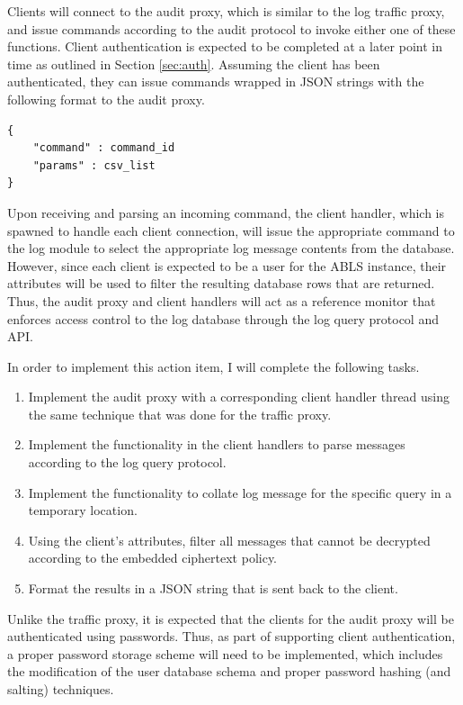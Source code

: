 \documentclass{sig-alternate}
\begin{document}
Clients will connect to the audit proxy, which is similar to the log traffic proxy, and issue commands according to
the audit protocol to invoke either one of these functions. Client authentication is expected to be completed at a later
point in time as outlined in Section \ref{sec:auth}. Assuming the client has been authenticated, they can issue commands
wrapped in JSON strings with the following format to the audit proxy. \\

\begin{lstlisting}
{     
    "command" : command_id
    "params" : csv_list
}
\end{lstlisting}

Upon receiving and parsing an incoming command, the client handler, which is spawned to handle each client connection,
will issue the appropriate command to the log module to select the appropriate log message contents from the database. 
However, since each client is expected to be a user for the ABLS instance, their attributes will be used to filter 
the resulting database rows that are returned. Thus, the audit proxy and client handlers will act
as a reference monitor that enforces access control to the log database through the log query protocol and API.

In order to implement this action item, I will complete the following tasks.

\begin{enumerate}
	\item Implement the audit proxy with a corresponding client handler thread using the same technique that was done for the traffic proxy. 
	\item Implement the functionality in the client handlers to parse messages according to the log query protocol.
	\item Implement the functionality to collate log message for the specific query in a temporary location.
	\item Using the client's attributes, filter all messages that cannot be decrypted according to the embedded ciphertext policy.
	\item Format the results in a JSON string that is sent back to the client.
\end{enumerate}

Unlike the traffic proxy, it is expected that the clients for the audit proxy will be authenticated using passwords. Thus, as
part of supporting client authentication, a proper password storage scheme will need to be implemented, which includes 
the modification of the user database schema and proper password hashing (and salting) techniques. 
\end{document}
